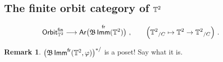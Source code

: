 \documentclass{amsart}
\theoremstyle{definition}
\newtheorem{remark}[theorem]{Remark}
\theoremstyle{remark}
\DeclareMathOperator{\Ar}{{\sf Ar}}
\DeclareMathOperator{\fr}{\sf fr}
\DeclareMathOperator{\Imm}{\sf Imm}
\begin{document}
{\color{magenta}


\subsection{The finite orbit category of $\mathbb T^2$}




\begin{equation}
\label{t75}
{\sf Orbit}^{\sf fin}_{\TT^2}
\longrightarrow
\Ar\bigl( \fB \Imm^{\fr}(\TT^2) \bigr)
~,\qquad
\Bigl(
{\TT^2}_{/C}
\mapsto 
\TT^2 \to {\TT^2}_{/C}
\Bigr)
~.
\end{equation}













\begin{remark}
$\bigl(\fB \Imm^{\fr}(\TT^2,\varphi) \bigr)^{\ast/}$ is a poset!
Say what it is.
\end{remark}





}
\end{document}
